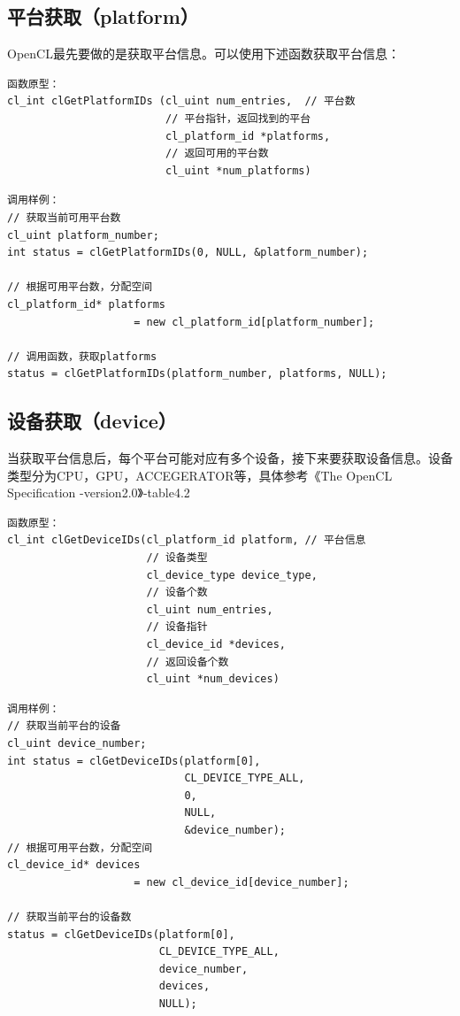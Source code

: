 \documentclass{ctexart}
\begin{document}
\subsection{平台获取（platform）}
OpenCL最先要做的是获取平台信息。可以使用下述函数获取平台信息：
\begin{verbatim}
函数原型：
cl_int clGetPlatformIDs (cl_uint num_entries,  // 平台数
                         // 平台指针，返回找到的平台
                         cl_platform_id *platforms,
                         // 返回可用的平台数
                         cl_uint *num_platforms)
\end{verbatim}

\begin{verbatim}
调用样例：
// 获取当前可用平台数
cl_uint platform_number;
int status = clGetPlatformIDs(0, NULL, &platform_number);

// 根据可用平台数，分配空间
cl_platform_id* platforms
                    = new cl_platform_id[platform_number];

// 调用函数，获取platforms
status = clGetPlatformIDs(platform_number, platforms, NULL);
\end{verbatim}

\subsection{设备获取（device）}
当获取平台信息后，每个平台可能对应有多个设备，接下来要获取设备信息。设备类型分为CPU，GPU，ACCEGERATOR等，具体参考《The OpenCL Specification -version2.0》-table4.2
\begin{verbatim}
函数原型：
cl_int clGetDeviceIDs(cl_platform_id platform, // 平台信息
                      // 设备类型
                      cl_device_type device_type,
                      // 设备个数
                      cl_uint num_entries,
                      // 设备指针
                      cl_device_id *devices,
                      // 返回设备个数
                      cl_uint *num_devices)
\end{verbatim}

\begin{verbatim}
调用样例：
// 获取当前平台的设备
cl_uint device_number;
int status = clGetDeviceIDs(platform[0],
                            CL_DEVICE_TYPE_ALL,
                            0,
                            NULL,
                            &device_number);
// 根据可用平台数，分配空间
cl_device_id* devices
                    = new cl_device_id[device_number];

// 获取当前平台的设备数
status = clGetDeviceIDs(platform[0],
                        CL_DEVICE_TYPE_ALL,
                        device_number,
                        devices,
                        NULL);
\end{verbatim}
\end{document}
